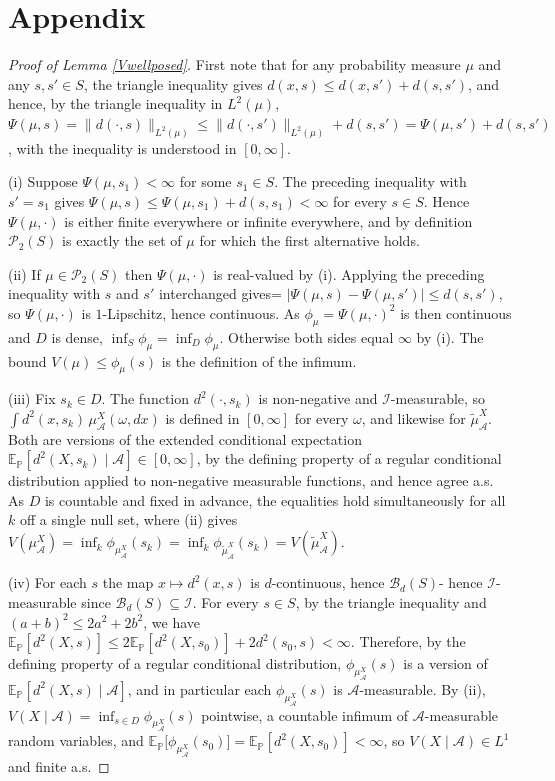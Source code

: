\documentclass{article}
\newcommand{\E}{\mathbb{E}_{\mathbb{P}}}
\newcommand{\I}{\mathcal{I}}
\newcommand{\1}{\mathbbm{1}}
\begin{document}



\section{Appendix}
\begin{proof}[Proof of Lemma \ref{Vwellposed}]
First note that for any probability measure $\mu$ and any $s,s'\in S$, the triangle inequality gives
$d(x,s)\le d(x,s')+d(s,s')$,
and hence, by the triangle inequality in $L^2(\mu)$,
$\Psi(\mu,s)
=\big\|d(\cdot,s)\big\|_{L^2(\mu)}
\le
\big\|d(\cdot,s')\big\|_{L^2(\mu)}+d(s,s')
=
\Psi(\mu,s')+d(s,s')$, with the inequality is understood in $[0,\infty]$.

(i) Suppose $\Psi(\mu,s_1)<\infty$ for some $s_1\in S$. The preceding inequality with $s'=s_1$
gives
$\Psi(\mu,s)\le\Psi(\mu,s_1)+d(s,s_1)<\infty$
for every $s\in S$. Hence $\Psi(\mu,\cdot)$ is either finite everywhere or infinite everywhere,
and by definition $\mathcal{P}_2(S)$ is exactly the set of $\mu$ for which the first alternative holds.

(ii) If $\mu\in\mathcal{P}_2(S)$ then $\Psi(\mu,\cdot)$ is real-valued by (i). Applying the
preceding inequality with $s$ and $s'$ interchanged gives=
$\big|\Psi(\mu,s)-\Psi(\mu,s')\big|\le d(s,s')$,
so $\Psi(\mu,\cdot)$ is $1$-Lipschitz, hence continuous. As
$\phi_\mu=\Psi(\mu,\cdot)^2$ is then continuous and $D$ is dense,
$\inf_S\phi_\mu=\inf_D\phi_\mu$. Otherwise both sides equal $\infty$ by (i). The bound
$V(\mu)\le\phi_\mu(s)$ is the definition of the infimum.

(iii) Fix $s_k\in D$. The function $d^2(\cdot,s_k)$ is non-negative and $\I$-measurable, so
$\int d^2(x,s_k)\,\mu^X_\mathcal{A}(\omega,dx)$ is defined in $[0,\infty]$ for every $\omega$, and
likewise for $\tilde\mu^X_\mathcal{A}$. Both are versions of the extended conditional expectation
$\E[d^2(X,s_k)\mid\mathcal{A}]\in[0,\infty]$, by the defining property of a regular conditional
distribution applied to non-negative measurable functions, and hence agree a.s. As $D$ is countable
and fixed in advance, the equalities hold simultaneously for all $k$ off a single null set, where
(ii) gives $V(\mu^X_\mathcal{A})=\inf_k\phi_{\mu^X_\mathcal{A}}(s_k)
=\inf_k\phi_{\tilde\mu^X_\mathcal{A}}(s_k)=V(\tilde\mu^X_\mathcal{A})$.

(iv) For each $s$ the map $x\mapsto d^2(x,s)$ is $d$-continuous, hence $\mathcal{B}_d(S)$- hence
$\I$-measurable since $\mathcal{B}_d(S)\subseteq\I$.  For every $s\in S$, by the triangle inequality and $(a+b)^2\le 2a^2+2b^2$, we have  $\E[d^2(X,s)] \le 2\E [d^2(X,s_0)]+2d^2(s_0,s)<\infty$. Therefore, by the defining property of a regular conditional distribution, $\phi_{\mu^X_\mathcal{A}}(s)$ is a version of
$\E[d^2(X,s)\mid\mathcal{A}]$, and
in particular each $\phi_{\mu^X_\mathcal{A}}(s)$ is $\mathcal{A}$-measurable. By (ii),
$V(X\mid\mathcal{A})=\inf_{s\in D}\phi_{\mu^X_\mathcal{A}}(s)$ pointwise, a countable infimum of
$\mathcal{A}$-measurable random variables, and
$\E\big[\phi_{\mu^X_\mathcal{A}}(s_0)\big]=\E[d^2(X,s_0)]<\infty$, so $V(X\mid\mathcal{A})\in L^1$ and finite a.s.
\end{proof}
\end{document}
